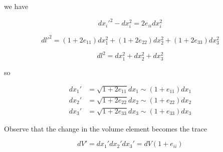 we have

\begin{equation}\label{eqn:continuumL3:130}
{dx_i'}^2 - dx_i^2 = 2 e_{ii} dx_i^2
\end{equation}

\begin{equation}\label{eqn:continuumL3:150}
{dl'}^2 = 
(1 + 2 e_{11}) dx_1^2
+(1 + 2 e_{22}) dx_2^2
+(1 + 2 e_{33}) dx_3^2
\end{equation}

\begin{equation}\label{eqn:continuumL3:170}
dl^2 = 
dx_1^2
+dx_2^2
+dx_3^2
\end{equation}

so 

\begin{align}\label{eqn:continuumL3:190}
dx_1' &= \sqrt{1 + 2 e_{11}} dx_1 \sim ( 1 + e_{11}) dx_1 \\
dx_2' &= \sqrt{1 + 2 e_{22}} dx_2 \sim ( 1 + e_{22}) dx_2 \\
dx_3' &= \sqrt{1 + 2 e_{33}} dx_3 \sim ( 1 + e_{33}) dx_3
\end{align}

Observe that the change in the volume element becomes the trace

\begin{equation}\label{eqn:continuumL3:210}
dV' = 
dx_1'
dx_2'
dx_3'
= dV(1 + e_{ii})
\end{equation}

